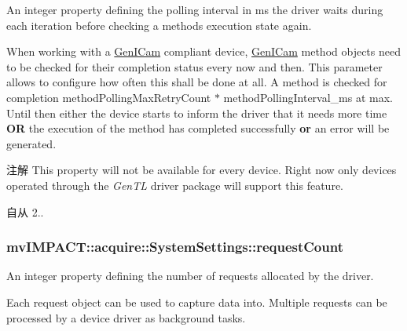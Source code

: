 An integer property defining the polling interval in ms the driver waits during each iteration before checking a methods execution state again. 

When working with a \hyperlink{namespacemv_i_m_p_a_c_t_1_1acquire_1_1_gen_i_cam}{Gen\+I\+Cam} compliant device, \hyperlink{namespacemv_i_m_p_a_c_t_1_1acquire_1_1_gen_i_cam}{Gen\+I\+Cam} method objects need to be checked for their completion status every now and then. This parameter allows to configure how often this shall be done at all. A method is checked for completion {\ttfamily method\+Polling\+Max\+Retry\+Count} $\ast$ {\ttfamily method\+Polling\+Interval\+\_\+ms} at max. Until then either the device starts to inform the driver that it needs more time {\bfseries O\+R} the execution of the method has completed successfully {\bfseries or} an error will be generated.

\begin{DoxyNote}{注解}
This property will not be available for every device. Right now only devices operated through the {\itshape Gen\+T\+L} driver package will support this feature.
\end{DoxyNote}
\begin{DoxySince}{自从}
2.. 
\end{DoxySince}
\hypertarget{classmv_i_m_p_a_c_t_1_1acquire_1_1_system_settings_aebae5e452b01f037b681faca41fb70ac}{
\subsubsection[{request\+Count}]{ mv\+I\+M\+P\+A\+C\+T\+::acquire\+::\+System\+Settings\+::request\+Count}}\label{classmv_i_m_p_a_c_t_1_1acquire_1_1_system_settings_aebae5e452b01f037b681faca41fb70ac}


An integer property defining the number of requests allocated by the driver. 

Each request object can be used to capture data into. Multiple requests can be processed by a device driver as background tasks.

